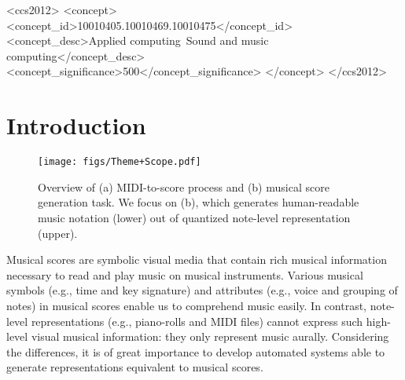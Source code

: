 \documentclass[sigconf]{acmart} %
\begin{document}
\begin{CCSXML}
<ccs2012>
<concept>
<concept_id>10010405.10010469.10010475</concept_id>
<concept_desc>Applied computing~Sound and music computing</concept_desc>
<concept_significance>500</concept_significance>
</concept>
</ccs2012>
\end{CCSXML}




\maketitle

\section{Introduction}

\begin{figure}[t]
 \centerline{
 \texttt{[image: figs/Theme+Scope.pdf]}}
 \caption{Overview of (a) MIDI-to-score process and (b) musical score generation task. We focus on (b), which generates human-readable music notation (lower) out of quantized note-level representation (upper).}
 \label{fig:overview}
\end{figure}

Musical scores are symbolic visual media that contain rich musical information necessary to read and play music on musical instruments. Various musical symbols (e.g., time and key signature) and attributes (e.g., voice and grouping of notes) in musical scores enable us to comprehend music easily. In contrast, note-level representations (e.g., piano-rolls and MIDI files) cannot express such high-level visual musical information: they only represent music aurally. Considering the differences, it is of great importance to develop automated systems able to generate representations equivalent to musical scores.
\end{document}

